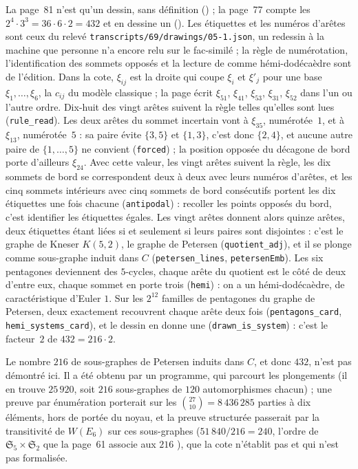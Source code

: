 {\small La page~81 n'est qu'un dessin, sans définition () ; la page~77 compte les  $2^4 \cdot 3^3 = 36 \cdot 6 \cdot 2 = 432$ et en dessine un (). Les étiquettes et les numéros d'arêtes sont ceux du relevé \texttt{transcripts/69/drawings/05-1.json}, un redessin à la machine que personne n'a encore relu sur le fac-similé ; la règle de numérotation, l'identification des sommets opposés et la lecture de  comme hémi-dodécaèdre sont de l'édition. Dans la cote, $\xi_{ij}$ est la droite qui coupe $\xi_i$ et $\xi'_j$ pour une base $\xi_1, \dots, \xi_6$, la $c_{ij}$ du modèle classique ; la page écrit $\xi_{51}$, $\xi_{41}$, $\xi_{53}$, $\xi_{31}$, $\xi_{52}$ dans l'un ou l'autre ordre. Dix-huit des vingt arêtes suivent la règle telles qu'elles sont lues (\texttt{rule\_read}). Les deux arêtes du sommet incertain vont à $\xi_{35}$, numérotée~$1$, et à $\xi_{13}$, numérotée~$5$ : sa paire évite $\{3, 5\}$ et $\{1, 3\}$, c'est donc $\{2, 4\}$, et aucune autre paire de $\{1, \dots, 5\}$ ne convient (\texttt{forced}) ; la position opposée du décagone de bord porte d'ailleurs $\xi_{24}$. Avec cette valeur, les vingt arêtes suivent la règle, les dix sommets de bord se correspondent deux à deux avec leurs numéros d'arêtes, et les cinq sommets intérieurs avec cinq sommets de bord consécutifs portent les dix étiquettes une fois chacune (\texttt{antipodal}) : recoller les points opposés du bord, c'est identifier les étiquettes égales. Les vingt arêtes donnent alors quinze arêtes, deux étiquettes étant liées si et seulement si leurs paires sont disjointes : c'est le graphe de Kneser $K(5, 2)$, le graphe de Petersen (\texttt{quotient\_adj}), et il se plonge comme sous-graphe induit dans $C$ (\texttt{petersen\_lines}, \texttt{petersenEmb}). Les six pentagones deviennent des $5$-cycles, chaque arête du quotient est le côté de deux d'entre eux, chaque sommet en porte trois (\texttt{hemi}) : on a un hémi-dodécaèdre, de caractéristique d'Euler $1$. Sur les $2^{12}$ familles de pentagones du graphe de Petersen, deux exactement recouvrent chaque arête deux fois (\texttt{pentagons\_card}, \texttt{hemi\_systems\_card}), et le dessin en donne une (\texttt{drawn\_is\_system}) : c'est le facteur~$2$ de $432 = 216 \cdot 2$.

Le nombre $216$ de sous-graphes de Petersen induits dans $C$, et donc $432$, n'est pas démontré ici. Il a été obtenu par un programme, qui parcourt les plongements (il en trouve $25\,920$, soit $216$ sous-graphes de $120$ automorphismes chacun) ; une preuve par énumération porterait sur les $\binom{27}{10} = 8\,436\,285$ parties à dix éléments, hors de portée du noyau, et la preuve structurée passerait par la transitivité de $W(E_6)$ sur ces sous-graphes ($51\,840 / 216 = 240$, l'ordre de $\mathfrak S_5 \times \mathfrak S_2$ que la page~61 associe aux $216$ ), que la cote n'établit pas et qui n'est pas formalisée.\par}
